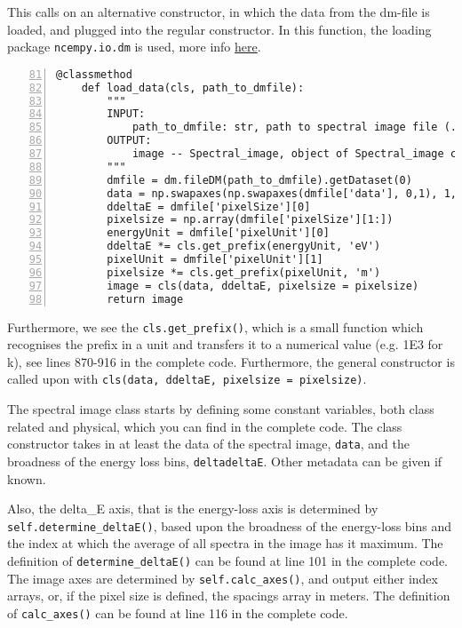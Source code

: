 \documentclass{article}
\begin{document}
This calls on an alternative constructor, in which the data from the dm-file is loaded, and plugged into the regular constructor. In this function, the loading package \verb|ncempy.io.dm| is used,  more info \href{https://pypi.org/project/ncempy/}{here}. 

%

\begin{lstlisting}[numbers=left, firstnumber=81]
    @classmethod
    def load_data(cls, path_to_dmfile):
        """
        INPUT: 
            path_to_dmfile: str, path to spectral image file (.dm3 or .dm4 extension)
        OUTPUT:
            image -- Spectral_image, object of Spectral_image class containing the data of the dm-file
        """
        dmfile = dm.fileDM(path_to_dmfile).getDataset(0)
        data = np.swapaxes(np.swapaxes(dmfile['data'], 0,1), 1,2)
        ddeltaE = dmfile['pixelSize'][0]
        pixelsize = np.array(dmfile['pixelSize'][1:])
        energyUnit = dmfile['pixelUnit'][0]
        ddeltaE *= cls.get_prefix(energyUnit, 'eV')
        pixelUnit = dmfile['pixelUnit'][1]
        pixelsize *= cls.get_prefix(pixelUnit, 'm')
        image = cls(data, ddeltaE, pixelsize = pixelsize)
        return image
\end{lstlisting}

Furthermore, we see the \verb|cls.get_prefix()|, which is a small function which recognises the prefix in a unit and transfers it to a numerical value (e.g. 1E3 for k), see lines 870-916 in the complete code. Furthermore, the general constructor is called upon with \verb|cls(data, ddeltaE, pixelsize = pixelsize)|.

The spectral image class starts by defining some constant variables, both class related and physical, which you can find in the complete code. The class constructor takes in at least the data of the spectral image, \verb|data|, and the broadness of the energy loss bins, \verb|deltadeltaE|. Other metadata can be given if known. 

Also, the delta\_E axis, that is the energy-loss axis is determined by \verb|self.determine_deltaE()|, based upon the broadness of the energy-loss bins and the index at which the average of all spectra in the image has it maximum. The definition of \verb|determine_deltaE()| can be found at line 101 in the complete code. The image axes are determined by \verb|self.calc_axes()|, and output either index arrays, or, if the pixel size is defined, the spacings array in meters. The definition of \verb|calc_axes()| can be found at line 116 in the complete code. 
\end{document}
